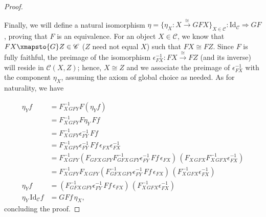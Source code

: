\documentclass[ 12pt ]{article}
\begin{document}
\begin{enumerate}
\begin{enumerate}
\begin{proof}
\begin{center}
				\end{center}
				Finally, we will define a natural isomorphism $\eta = \{ \eta_X : X \xrightarrow{\cong} GF X \}_{X \in \mathscr{C}} : \mathrm{Id}_\mathscr{C} \Rightarrow GF$, proving that $F$ is an equivalence. For an object $X \in \mathscr{C}$, we know that $FX \xmapsto{G} Z \in \mathscr{C}$ ($Z$ need not equal $X$) such that $FX \cong FZ$. Since $F$ is fully faithful, the preimage of the isomorphism $\epsilon_{FX}^{-1} : FX \xrightarrow{\cong} FZ$ (and its inverse) will reside in $\mathscr{C}(X, Z)$; hence, $X \cong Z$ and we associate the preimage of $\epsilon_{FX}^{-1}$ with the component $\eta_X$, assuming the axiom of global choice as needed. As for naturality, we have
				\begin{center}
				\end{center}
				\begin{align*}
					\eta_Y f &= F_{X\, GFY}^{-1} F(\eta_Y f) \\
					&= F_{X\, GFY}^{-1} F\eta_Y\, Ff \\
					&= F_{X\, GFY}^{-1} \epsilon_{FY}^{-1}\, Ff \\
					&= F_{X\, GFY}^{-1} \epsilon_{FY}^{-1}\, Ff\, \epsilon_{FX} \epsilon_{FX}^{-1} \\
					&= F_{X\, GFY}^{-1} (F_{GFX\, GFY} F_{GFX\, GFY}^{-1} \epsilon_{FY}^{-1}\, Ff\, \epsilon_{FX})\, (F_{X\, GFX} F_{X\, GFX}^{-1} \epsilon_{FX}^{-1}) \\
					&= F_{X\, GFY}^{-1} F_{X\, GFY} (F_{GFX\, GFY}^{-1} \epsilon_{FY}^{-1}\, Ff\, \epsilon_{FX})\, (F_{X\, GFX}^{-1} \epsilon_{FX}^{-1}) \\
					\eta_Y f &= (F_{GFX\, GFY}^{-1} \epsilon_{FY}^{-1}\, Ff\, \epsilon_{FX})\, (F_{X\, GFX}^{-1} \epsilon_{FX}^{-1}) \\
					\eta_Y\, \mathrm{Id}_\mathscr{C} f &= GF f\, \eta_X,
				\end{align*}
				concluding the proof.
			\end{proof}
		\end{enumerate}



\end{enumerate}
\end{document}
